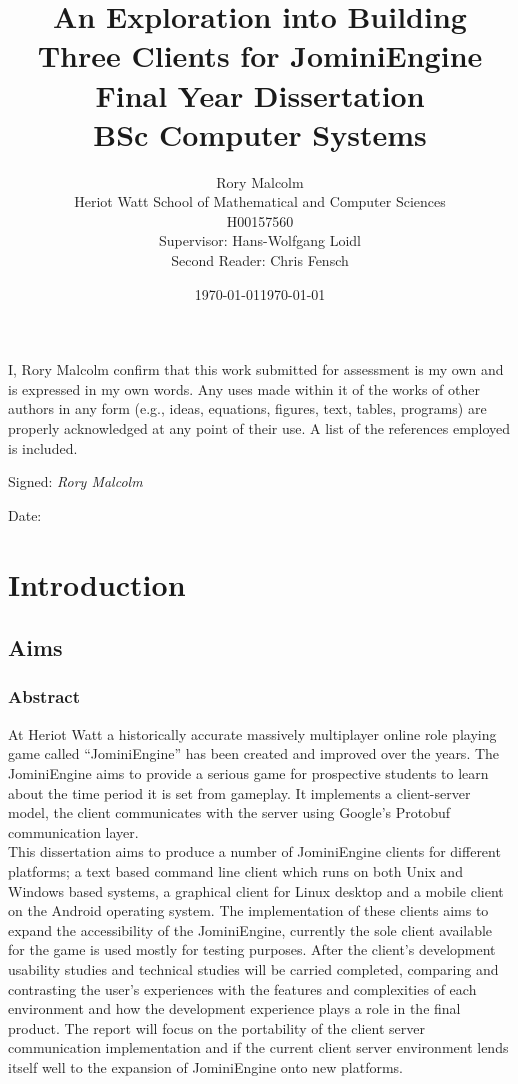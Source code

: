 \documentclass{article}
\title{An Exploration into Building Three Clients for JominiEngine\\ Final Year Dissertation \\BSc Computer Systems}
\author{Rory Malcolm\\Heriot Watt School of Mathematical and Computer Sciences\\H00157560\\Supervisor: Hans-Wolfgang Loidl\\Second Reader: Chris Fensch}
\date{\today}
\begin{document}
	\maketitle
	\newpage
	\tableofcontents
	\newpage
	I, Rory Malcolm confirm that this work submitted for assessment is my own and is expressed
	in my own words. Any uses made within it of the works of other authors in any
	form (e.g., ideas, equations, figures, text, tables, programs) are properly acknowledged
	at any point of their use. A list of the references employed is included.
	
	Signed: \textit{Rory Malcolm}
	
	Date: \date{\today}
	\newpage
	\section{Introduction}
	\subsection{Aims}
	\subsubsection{Abstract}
	At Heriot Watt a historically accurate massively multiplayer online role playing game called “JominiEngine” has been created and improved over the years. The JominiEngine aims to provide a serious game for prospective students to learn about the time period it is set from gameplay. It implements a client-server model, the client communicates with the server using Google's Protobuf communication layer.\\

	This dissertation aims to produce a number of JominiEngine clients for different platforms; a text based command line client which runs on both Unix and Windows based systems, a graphical client for Linux desktop and a mobile client on the Android operating system. The implementation of these clients aims to expand the accessibility of the JominiEngine, currently the sole client available for the game is used mostly for testing purposes. After the client's development usability studies and technical studies will be carried completed, comparing and contrasting the user’s experiences with the features and complexities of each environment and how the development experience plays a role in the final product. The report will focus on the portability of the client server communication implementation and if the current client server environment lends itself well to the expansion of JominiEngine onto new platforms.
\end{document}
